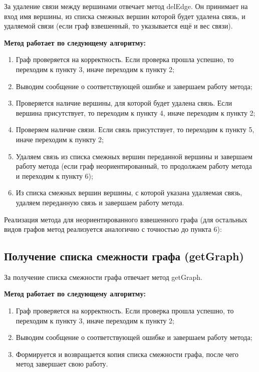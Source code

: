 \documentclass[bachelor, och, pract]{SCWorks}
\begin{document}
За удаление связи между вершинами отвечает метод
delEdge. Он принимает на вход имя вершины, из списка смежных вершин
которой будет удалена связь, и удаляемой связи (если
граф взвешенный, то указывается ещё и вес связи).
\bigskip

\textbf{Метод работает по следующему алгоритму:}

\begin{enumerate}
  \item {Граф проверяется на корректность. Если проверка прошла успешно,
  то переходим к пункту 3, иначе переходим к пункту 2;}
  \item {Выводим сообщение о соответствующей ошибке и завершаем работу метода;}
  \item {Проверяется наличие вершины, для которой будет удалена связь. Если вершина
  присутствует, то переходим к пункту 4, иначе переходим к пункту 2;}
  \item {Проверяем наличие связи. Если связь присутствует, то переходим к пункту 5,
  иначе переходим к пункту 2;}
  \item {Удаляем связь из списка смежных вершин переданной вершины и завершаем работу метода
  (если граф неориентированный, то продолжаем работу метода и переходим к пункту 6);}
  \item {Из списка смежных вершин вершины, с которой указана удаляемая связь, удаляем переданную
  связь и завершаем работу метода.}
\end{enumerate}

Реализация метода для неориентированного взвешенного графа (для остальных видов графов
метод реализуется аналогично с точностью до пункта 6):
\bigskip


\bigskip

\subsection{Получение списка смежности графа (getGraph)}

За получение списка смежности графа отвечает метод getGraph.
\bigskip

\textbf{Метод работает по следующему алгоритму:}

\begin{enumerate}
  \item {Граф проверяется на корректность. Если проверка прошла успешно,
  то переходим к пункту 3, иначе переходим к пункту 2;}
  \item {Выводим сообщение о соответствующей ошибке и завершаем работу метода;}
  \item {Формируется и возвращается копия списка смежности графа, после чего
  метод завершает свою работу.}
\end{enumerate}
\end{document}
